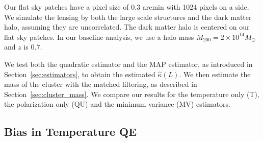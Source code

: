 \documentclass[prd, superscriptaddress, tightenlines, longbibliography, nofootinbib, eqsecnum, amsfonts, amsmath, floatfix, twocolumn, notitlepage]{revtex4-2}
\newcommand{\LL}[1]{{\color{orange}{LL: #1}}}
\begin{document}
Our flat sky patches have a pixel size of $0.3$ arcmin with 1024 pixels on a side. We simulate the lensing by both the large scale structures and the dark matter halo, assuming they are uncorrelated. The dark matter halo is centered on our flat sky patches. In our baseline analysis, we use  a halo mass $M_{200} = 2\times10^{14} M_{\odot}$ and $z$ is $0.7$. 

We test both the quadratic estimator and the MAP estimator, as introduced in Section~\ref{sec:estimators}, to obtain the estimated $\hat{\kappa}(L)$.
We then estimate the mass of the cluster with the matched filtering, as described in Section~\ref{sec:cluster_mass}. We compare our results for the temperature only (T), the polarization only (QU) and the minimum variance (MV) estimators.


\subsection{Bias in Temperature QE}
\end{document}
